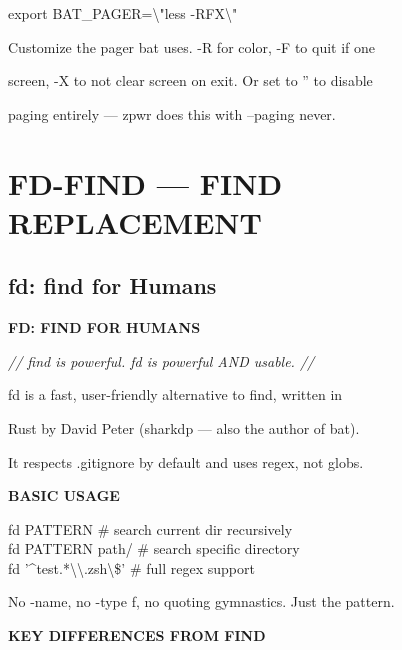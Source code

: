 \documentclass[11pt,a4paper,twoside]{book}
\begin{document}
export BAT\_PAGER=\textbackslash{}"less -RFX\textbackslash{}"

Customize the pager bat uses. -R for color, -F to quit if one

screen, -X to not clear screen on exit. Or set to '' to disable

paging entirely — zpwr does this with --paging never.


\vspace{16pt}


\chapter{FD-FIND — FIND REPLACEMENT}

\section{fd: find for Humans}


\vspace{10pt}
{\large\bfseries\color{neoncyan} FD: FIND FOR HUMANS}\vspace{6pt}

{\small\itshape\color{dimtext} // find is powerful. fd is powerful AND usable. //}

\begin{codebox}
fd is a fast, user-friendly alternative to find, written in\\
\end{codebox}

Rust by David Peter (sharkdp — also the author of bat).

It respects .gitignore by default and uses regex, not globs.


\vspace{12pt}
{\bfseries\color{neonyellow} BASIC USAGE}\vspace{4pt}

\begin{codebox}
fd PATTERN           \# search current dir recursively\\
fd PATTERN path/     \# search specific directory\\
fd '\textasciicircum{}test.*\textbackslash{}\textbackslash{}.zsh\textbackslash{}\$'  \# full regex support\\
\end{codebox}

No -name, no -type f, no quoting gymnastics. Just the pattern.


\vspace{12pt}
{\bfseries\color{neonyellow} KEY DIFFERENCES FROM FIND}\vspace{4pt}
\end{document}
